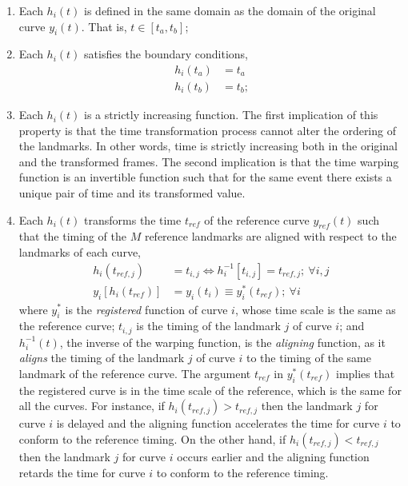 \begin{enumerate}
	
	\item Each $h_i(t)$ is defined in the same domain as the domain of the original curve $y_i(t)$. That is, $t \in [t_a, t_b]$;
  
	\item Each $h_i(t)$ satisfies the boundary conditions,
    \begin{equation}
      \begin{split}
        h_i(t_a) & = t_a \\
        h_i(t_b) & = t_b \text{;}
      \end{split}
    \label{eq:warping_boundaries}
    \end{equation}
   
	\item Each $h_i(t)$ is a strictly increasing function. The first implication of this property is that the time transformation process cannot alter the ordering of the landmarks.
         In other words, time is strictly increasing both in the original and the transformed frames.
         The second implication is that the time warping function is an invertible function 
         such that for the same event there exists a unique pair of time and its transformed value.
  
	\item Each $h_i(t)$ transforms the time $t_{ref}$ of the reference curve $y_{ref}(t)$ such that the timing of the $M$ reference landmarks are aligned with respect to the landmarks of each curve,
          \begin{equation}
            \begin{split}
						  h_i (t_{ref,j}) 		& = t_{i,j} \iff h_i^{-1}[t_{i,j}] = t_{ref,j}  ; \ \forall i,j \\
							y_i [h_i(t_{ref})]  & =	y_i(t_{i}) \equiv y^*_i(t_{ref}) ; \ \forall i
            \end{split}
          \label{eq:warping_transformation}
          \end{equation}
          where $y_i^*$ is the \emph{registered} function of curve $i$, whose time scale is the same as the reference curve;
					$t_{i,j}$ is the timing of the landmark $j$ of curve $i$;
					and $h^{-1}_i(t)$, the inverse of the warping function, is the \emph{aligning} function, as it \emph{aligns} the timing of the landmark $j$ of curve $i$ to the timing of the same landmark of the reference curve. 
					The argument $t_{ref}$ in $y_i^*(t_{ref})$ implies that the registered curve is in the time scale of the reference, which is the same for all the curves.
          For instance, if $h_i(t_{ref,j}) > t_{ref,j}$ then the landmark $j$ for curve $i$ is delayed 
          and the aligning function accelerates the time for curve $i$ to conform to the reference timing.
          On the other hand, if $h_i(t_{ref,j}) < t_{ref,j}$ then the landmark $j$ for curve $i$ occurs earlier
          and the aligning function retards the time for curve $i$ to conform to the reference timing.
\end{enumerate}

